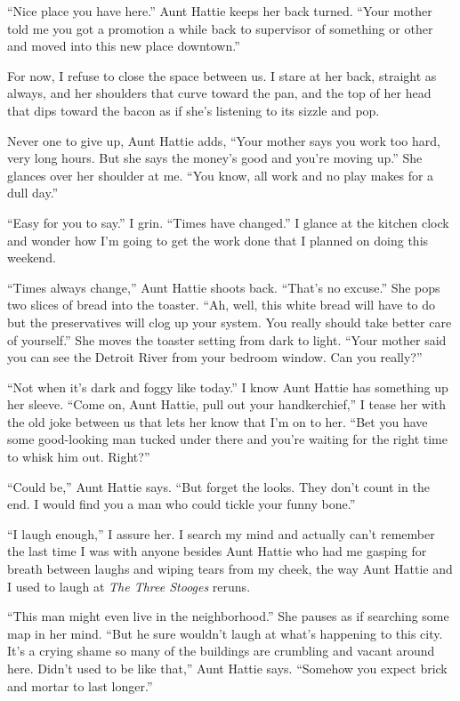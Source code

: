 \documentclass[
]{article}
\begin{document}
``Nice place you have here.'' Aunt Hattie keeps her back turned. ``Your
mother told me you got a promotion a while back to supervisor of
something or other and moved into this new place downtown.''

For now, I refuse to close the space between us. I stare at her back,
straight as always, and her shoulders that curve toward the pan, and the
top of her head that dips toward the bacon as if she's listening to its
sizzle and pop.

Never one to give up, Aunt Hattie adds, ``Your mother says you work too
hard, very long hours. But she says the money's good and you're moving
up.'' She glances over her shoulder at me. ``You know, all work and no
play makes for a dull day.''

``Easy for you to say.'' I grin. ``Times have changed.'' I glance at the
kitchen clock and wonder how I'm going to get the work done that I
planned on doing this weekend.

``Times always change,'' Aunt Hattie shoots back. ``That's no excuse.''
She pops two slices of bread into the toaster. ``Ah, well, this white
bread will have to do but the preservatives will clog up your system.
You really should take better care of yourself.'' She moves the toaster
setting from dark to light. ``Your mother said you can see the Detroit
River from your bedroom window. Can you really?''

``Not when it's dark and foggy like today.'' I know Aunt Hattie has
something up her sleeve. ``Come on, Aunt Hattie, pull out your
handkerchief,'' I tease her with the old joke between us that lets her
know that I'm on to her. ``Bet you have some good-looking man tucked
under there and you're waiting for the right time to whisk him out.
Right?''

``Could be,'' Aunt Hattie says. ``But forget the looks. They don't count
in the end. I would find you a man who could tickle your funny bone.''

``I laugh enough,'' I assure her. I search my mind and actually can't
remember the last time I was with anyone besides Aunt Hattie who had me
gasping for breath between laughs and wiping tears from my cheek, the
way Aunt Hattie and I used to laugh at \emph{The Three Stooges} reruns.

``This man might even live in the neighborhood.'' She pauses as if
searching some map in her mind. ``But he sure wouldn't laugh at what's
happening to this city. It's a crying shame so many of the buildings are
crumbling and vacant around here. Didn't used to be like that,'' Aunt
Hattie says. ``Somehow you expect brick and mortar to last longer.''
\end{document}
